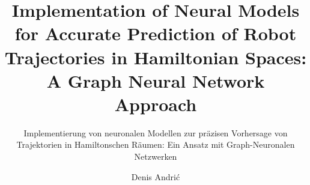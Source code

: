 \documentclass[
	ngerman,
	ruledheaders=section,%
	class=report,%
	thesis={type=master},%
	accentcolor=9c,%
	custommargins=true,%
	marginpar=false,%
	parskip=half-,%
	fontsize=11pt,%
]{tudapub}
\begin{document}

\title{Implementation of Neural Models for Accurate Prediction of Robot Trajectories in Hamiltonian Spaces: A Graph Neural Network Approach}
\subtitle{Implementierung von neuronalen Modellen zur präzisen Vorhersage von Trajektorien in Hamiltonschen Räumen: 
	Ein Ansatz mit Graph-Neuronalen Netzwerken}
\author[D. Andrić]{Denis Andrić}

\submissiondate{\today}
\examdate{\today}
\end{document}
